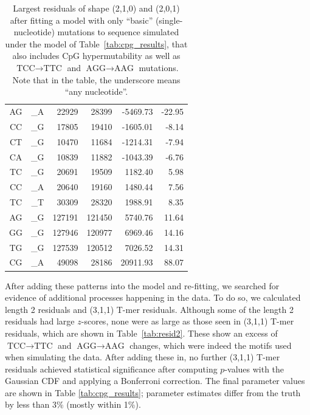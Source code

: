 \documentclass{article}
\newcommand{\nA}{\mbox{A}}  %
\newcommand{\nC}{\mbox{C}}
\newcommand{\nG}{\mbox{G}}
\newcommand{\nT}{\mbox{T}}
\theoremstyle{plain}
\theoremstyle{definition}
\begin{document}
\begin{table}
\begin{center}
\begin{tabular}{ccrrrr}
                \nA\nG  &  \_\nA  &   22929  &   28399  &   -5469.73  &  -22.95 \\
                \nC\nC  &  \_\nG  &   17805  &   19410  &   -1605.01  &   -8.14 \\
                \nC\nT  &  \_\nG  &   10470  &   11684  &   -1214.31  &   -7.94 \\
                \nC\nA  &  \_\nG  &   10839  &   11882  &   -1043.39  &   -6.76 \\
                \hline
                \nT\nC  &  \_\nG  &   20691  &   19509  &    1182.40  &    5.98 \\
                \nC\nC  &  \_\nA  &   20640  &   19160  &    1480.44  &    7.56 \\
                \nT\nC  &  \_\nT  &   30309  &   28320  &    1988.91  &    8.35 \\
                \nA\nG  &  \_\nG  &  127191  &  121450  &    5740.76  &   11.64 \\
                \nG\nG  &  \_\nG  &  127946  &  120977  &    6969.46  &   14.16 \\
                \nT\nG  &  \_\nG  &  127539  &  120512  &    7026.52  &   14.31 \\
                \nC\nG  &  \_\nA  &   49098  &   28186  &   20911.93  &   88.07 \\
                \hline
        \end{tabular}
    \end{center}
    \caption{
        Largest residuals of shape (2,1,0) and (2,0,1) after fitting a model with only ``basic''
        (single-nucleotide) mutations to sequence simulated under the model
        of Table~\ref{tab:cpg_results}, that also includes CpG hypermutability
        as well as $\nT\nC\nC \to \nT\nT\nC$ and $\nA\nG\nG \to \nA\nA\nG$ mutations.
        Note that in the table, the underscore means ``any nucleotide''.
        \label{tab:resid1}
    }
\end{table}

After adding these patterns into the model and re-fitting, we searched for evidence of additional processes happening in the data.
To do so, we calculated length 2 residuals and (3,1,1) T-mer residuals.
Although some of the length 2 residuals had large $z$-scores,
none were as large as those seen in (3,1,1) T-mer residuals,
which are shown in Table~\ref{tab:resid2}.
These show an excess of $\nT\nC\nC \to \nT\nT\nC$ and $\nA\nG\nG \to \nA\nA\nG$ changes,
which were indeed the motifs used when simulating the data.
After adding these in,
no further (3,1,1) T-mer residuals achieved
statistical significance after computing $p$-values with the Gaussian CDF
and applying a Bonferroni correction.
The final parameter values are shown in Table \ref{tab:cpg_results};
parameter estimates differ from the truth by less than 3\% (mostly within 1\%).
\end{document}
